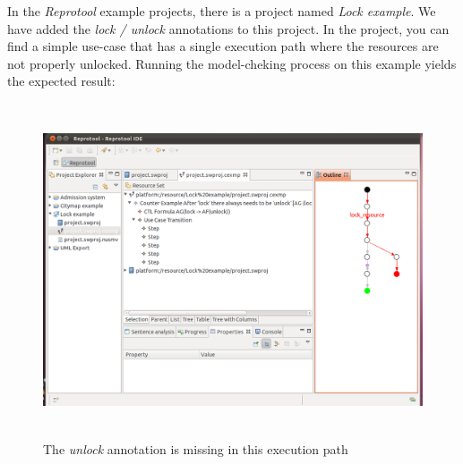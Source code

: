In the \emph{Reprotool} example projects, there is a project named \emph{Lock example}. We have added the \emph{lock / unlock}
annotations to this project. In the project, you can find a simple use-case that has a single execution path where the resources
are not properly unlocked. Running the model-cheking process on this example yields the expected result:

\begin{figure}[ht]
  \centering
  \includegraphics[height=280pt]{images/reprotoolLockUnlock2}
  \caption{The \emph{unlock} annotation is missing in this execution path}
  \label{fig:reprotoolLockUnlock2}
\end{figure}